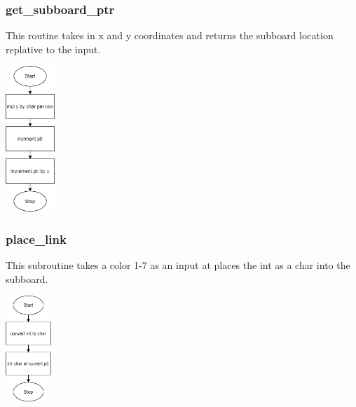 \documentclass{article}
\begin{document}
    \subsubsection{get\_subboard\_ptr}
        This routine takes in x and y coordinates and returns the subboard
        location replative to the input.
        \begin{center}
            {\includegraphics[height=5.5cm]{get_subboard_ptr.png}\centering} 
        \end{center}

    \subsubsection{place\_link}
        This subroutine takes a color 1-7 as an input at places the int as a 
        char into the subboard.
        \begin{center}
            {\includegraphics[height=4cm]{place_link.png}\centering} 
        \end{center}
        \newpage
\end{document}
